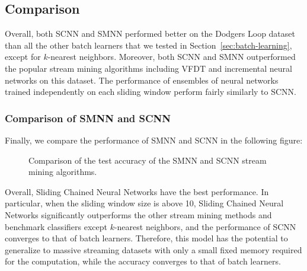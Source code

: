 \documentclass[conference]{IEEEtran}
\begin{document}
		\subsection{Comparison} 
		Overall, both SCNN and SMNN performed better on the Dodgers Loop dataset than all the other batch learners that we tested in Section~\ref{sec:batch-learning}, except for $k$-nearest neighbors. Moreover, both SCNN and SMNN outperformed the popular stream mining algorithms including VFDT and incremental neural networks on this dataset. The performance of ensembles of neural networks trained independently on each sliding window perform fairly similarly to SCNN. 

		\subsubsection{Comparison of SMNN and SCNN}
		Finally, we compare the performance of SMNN and SCNN in the following figure:
		\begin{figure}[H]
			\centering
			\caption{Comparison of the test accuracy of the SMNN and SCNN stream mining algorithms.}
			\label{fig:results-trees-ensemble}
		\end{figure}

		Overall, Sliding Chained Neural Networks have the best performance. In particular, when the sliding window size is above 10, Sliding Chained Neural Networks significantly outperforms the other stream mining methods and benchmark classifiers except $k$-nearest neighbors, and the performance of SCNN converges to that of batch learners. Therefore, this model has the potential to generalize to massive streaming datasets with only a small fixed memory required for the computation, while the accuracy converges to that of batch learners.
		
\end{document}
